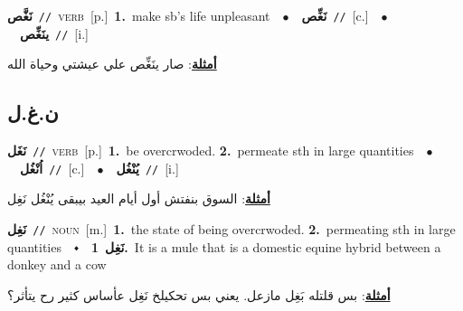 \documentclass[10pt,a4paper,twoside]{article} %
\begin{document}
\begin{multicols}{2}
{\setlength\topsep{0pt}\textbf{\foreignlanguage{arabic}{نَغَّص}}\ {\color{gray}\texttt{//}\color{black}}\ \textsc{verb}\ [p.]\ \textbf{1.}~make sb's life unpleasant\ \ $\bullet$\ \ \setlength\topsep{0pt}\textbf{\foreignlanguage{arabic}{نَغِّص}}\ {\color{gray}\texttt{//}\color{black}}\ [c.]\ \ $\bullet$\ \ \setlength\topsep{0pt}\textbf{\foreignlanguage{arabic}{ينَغِّص}}\ {\color{gray}\texttt{//}\color{black}}\ [i.]\  \begin{flushright}\color{gray}\foreignlanguage{arabic}{\textbf{\underline{\foreignlanguage{arabic}{أمثلة}}}: صار ينَغِّص علي عيشتي وحياة الله}\end{flushright}\color{black}} \vspace{2mm}

\vspace{-3mm}
\subsection*{\color{blue}\foreignlanguage{arabic}{ن.غ.ل}\color{blue}{}} 

{\setlength\topsep{0pt}\textbf{\foreignlanguage{arabic}{نَغَل}}\ {\color{gray}\texttt{//}\color{black}}\ \textsc{verb}\ [p.]\ \textbf{1.}~be overcrwoded.  \textbf{2.}~permeate sth in large quantities\ \ $\bullet$\ \ \setlength\topsep{0pt}\textbf{\foreignlanguage{arabic}{اُنْغُل}}\ {\color{gray}\texttt{//}\color{black}}\ [c.]\ \ $\bullet$\ \ \setlength\topsep{0pt}\textbf{\foreignlanguage{arabic}{يُنْغُل}}\ {\color{gray}\texttt{//}\color{black}}\ [i.]\  \begin{flushright}\color{gray}\foreignlanguage{arabic}{\textbf{\underline{\foreignlanguage{arabic}{أمثلة}}}: السوق بنفتش أول أيام العيد بيبقى يُنْغُل نَغِل}\end{flushright}\color{black}} \vspace{2mm}

{\setlength\topsep{0pt}\textbf{\foreignlanguage{arabic}{نَغِل}}\ {\color{gray}\texttt{//}\color{black}}\ \textsc{noun}\ [m.]\ \textbf{1.}~the state of being overcrwoded.  \textbf{2.}~permeating sth in large quantities\ \ $\smblkdiamond$\ \ \setlength\topsep{0pt}\textbf{\foreignlanguage{arabic}{نَغِل}}\ \textbf{1.}~It is a mule that is a domestic equine hybrid between a donkey and a cow\  \begin{flushright}\color{gray}\foreignlanguage{arabic}{\textbf{\underline{\foreignlanguage{arabic}{أمثلة}}}: بس قلتله بَغِل مازعل. يعني بس تحكيلخ نَغِل عأساس كثير رح يتأثر؟}\end{flushright}\color{black}} \vspace{2mm}


\end{multicols}
\end{document}
